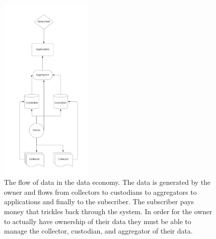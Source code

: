 \begin{figure}[!htbp] 
    \centering
    \includegraphics[width=170]{images/persona_strucutre.jpg}
    \caption{The flow of data in the data economy. The data is generated by the owner and flows from collectors to custodians to aggregators to applications and finally to the subscriber. The subscriber pays money that trickles back through the system. In order for the owner to actually have ownership of their data they must be able to manage the collector, custodian, and aggregator of their data.}
    \label{fig:DataActors}
\end{figure}


